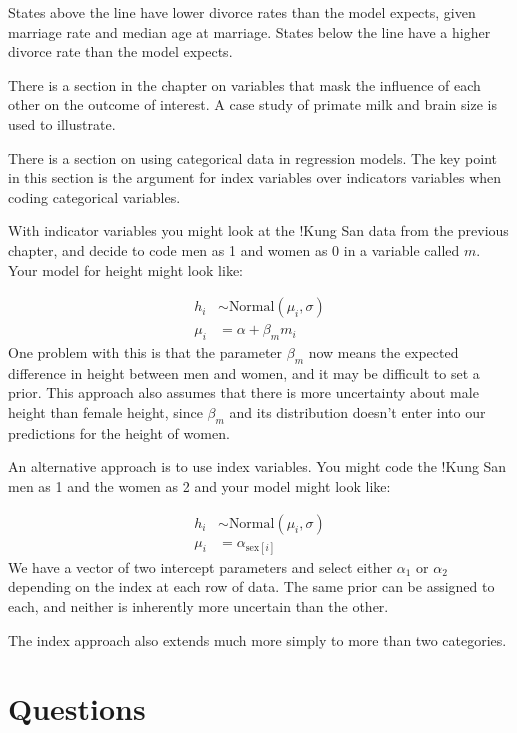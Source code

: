 \documentclass[
]{book}
\begin{document}
States above the line have lower divorce rates than the model expects, given marriage rate and median age at marriage. States below the line have a higher divorce rate than the model expects.

There is a section in the chapter on variables that mask the influence of each other on the outcome of interest. A case study of primate milk and brain size is used to illustrate.

There is a section on using categorical data in regression models. The key point in this section is the argument for index variables over indicators variables when coding categorical variables.

With indicator variables you might look at the !Kung San data from the previous chapter, and decide to code men as 1 and women as 0 in a variable called \(m\). Your model for height might look like:

\[
\begin{aligned}
h_i &∼ \text{Normal}(\mu_i, \sigma) \\
\mu_i &= \alpha + \beta_m m_i
\end{aligned}
\]
One problem with this is that the parameter \(\beta_m\) now means the expected difference in height between men and women, and it may be difficult to set a prior. This approach also assumes that there is more uncertainty about male height than female height, since \(\beta_m\) and its distribution doesn't enter into our predictions for the height of women.

An alternative approach is to use index variables. You might code the !Kung San men as 1 and the women as 2 and your model might look like:

\[
\begin{aligned}
h_i &∼ \text{Normal}(\mu_i, \sigma) \\
\mu_i &= \alpha_{\text{sex}[i]} 
\end{aligned}
\]
We have a vector of two intercept parameters and select either \(\alpha_1\) or \(\alpha_2\) depending on the index at each row of data. The same prior can be assigned to each, and neither is inherently more uncertain than the other.

The index approach also extends much more simply to more than two categories.

\hypertarget{questions-4}{%
\section{Questions}\label{questions-4}}
\end{document}
